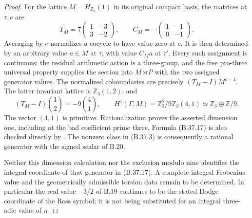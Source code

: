 \begin{proof}
For the lattice $M=H_{\mathbb Z_3}(1)$ in its original
compact basis, the matrices at $\tau,c$ are
\[
 T_M=7\begin{pmatrix}1&-3\\3&-2\end{pmatrix},\qquad
 C_M=-\begin{pmatrix}1&-1\\0&-1\end{pmatrix}.                  \tag{B.37.16}
\]
Averaging by $c$ normalizes a cocycle to have value
zero at $c$. It is then determined by an arbitrary
value $a\in M$ at $\tau$, with value $C_Ma$ at $\tau'$.
Every such assignment is continuous: the residual
arithmetic action is a three-group, and the free
pro-three universal property supplies the section
into $M\rtimes P$ with the two assigned generator
values. The normalized coboundaries are precisely
$(T_M-I)M^{c=1}$.
The latter invariant lattice is $\mathbb Z_3(1,2)$, and
\[
 (T_M-I)\binom12=-9\binom41,\qquad
 H^1(\Gamma,M)=
       \mathbb Z_3^2/9\mathbb Z_3(4,1)
          \simeq\mathbb Z_3\oplus\mathbb Z/9.                \tag{B.37.17}
\]
The vector $(4,1)$ is primitive. Rationalization proves
the asserted dimension one, including at the bad
coefficient prime three. Formula (B.37.17) is also
checked directly by .
The nonzero class in (B.37.3) is consequently a rational
generator with the signed scalar of B.20.

Neither this dimension calculation nor the exclusion
modulo nine identifies the integral coordinate of that
generator in (B.37.17). A complete integral Frobenius
value and the geometrically admissible torsion data
remain to be determined. In particular the real value
$-3/2$ of B.19 continues to be the stated Hodge coordinate
of the Ross symbol; it is not being substituted for
an integral three-adic value of $\eta$.
\end{proof}
